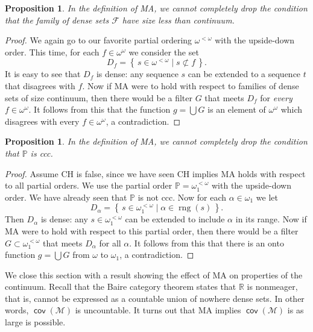 \documentclass[11pt,oneside]{amsbook}
\newcommand{\set}[1]{\left\{\,#1\,\right\}}
\newcommand{\R}{\mathbb R}
\newcommand{\PP}{\mathbb P}
\newcommand{\Meager}{\mathcal M}
\DeclareMathOperator{\rng}{rng}
\DeclareMathOperator{\cov}{\mathsf{cov}}
\theoremstyle{definition}
\theoremstyle{plain}
\newtheorem{proposition}[theorem]{Proposition}
\theoremstyle{definition}
\theoremstyle{remark}
\numberwithin{equation}{section}
\numberwithin{figure}{section}
\begin{document}
\begin{proposition}
  In the definition of MA, we cannot completely drop the condition that the family of dense sets $\mathcal F$ have size less than continuum.
\end{proposition}

\begin{proof}
  We again go to our favorite partial ordering $\omega^{<\omega}$ with the upside-down order. This time, for each $f\in\omega^\omega$ we consider the set
  \[D_f=\set{s\in\omega^{<\omega}\mid s\not\subset f}\text{.}
  \]
  It is easy to see that $D_f$ is dense: any sequence $s$ can be extended to a sequence $t$ that disagrees with $f$. Now if MA were to hold with respect to families of dense sets of size continuum, then there would be a filter $G$ that meets $D_f$ for \emph{every} $f\in\omega^\omega$. It follows from this that the function $g=\bigcup G$ is an element of $\omega^\omega$ which disagrees with every $f\in\omega^\omega$, a contradiction.
\end{proof}

\begin{proposition}
  In the definition of MA, we cannot completely drop the condition that $\PP$ is ccc.
\end{proposition}

\begin{proof}
  Assume CH is false, since we have seen CH implies MA holds with respect to all partial orders. We use the partial order $\PP=\omega_1^{<\omega}$ with the upside-down order. We have already seen that $\PP$ is not ccc. Now for each $\alpha\in\omega_1$ we let
  \[D_\alpha=\set{s\in\omega_1^{<\omega}\mid\alpha\in\rng(s)}\text{.}
  \]
  Then $D_\alpha$ is dense: any $s\in\omega_1^{<\omega}$ can be extended to include $\alpha$ in its range. Now if MA were to hold with respect to this partial order, then there would be a filter $G\subset\omega_1^{<\omega}$ that meets $D_\alpha$ for all $\alpha$. It follows from this that there is an onto function $g=\bigcup G$ from $\omega$ to $\omega_1$, a contradiction.
\end{proof}

We close this section with a result showing the effect of MA on properties of the continuum. Recall that the Baire category theorem states that $\R$ is nonmeager, that is, cannot be expressed as a countable union of nowhere dense sets. In other words, $\cov(\Meager)$ is uncountable. It turns out that MA implies $\cov(\Meager)$ is as large is possible.
\end{document}
